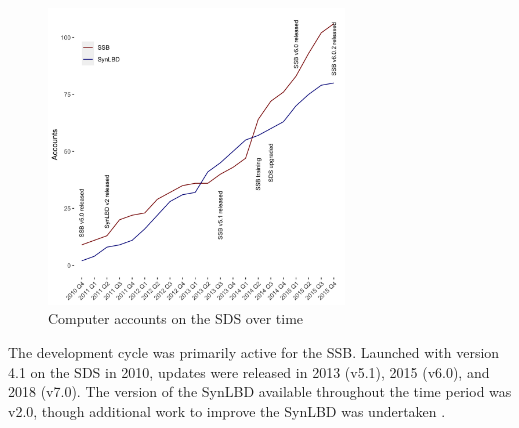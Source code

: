 \documentclass[12pt]{article}
\begin{document}
\begin{figure}[h]
    \centering
    \includegraphics[width=0.7\textwidth]{figs/accounts-2015.png}
    \caption{Computer accounts on the SDS over time}
    \label{fig:growth_in_sds}
\end{figure}

The development cycle was primarily active for the \ac{SSB}. Launched with version 4.1 on the \ac{SDS} in 2010, updates were released in 2013 (v5.1), 2015 (v6.0), and 2018 (v7.0). The version of the \ac{SynLBD} available throughout the time period was v2.0, though additional work to improve the \ac{SynLBD} was undertaken \citep{SJIAOS-2014d}.



\end{document}
